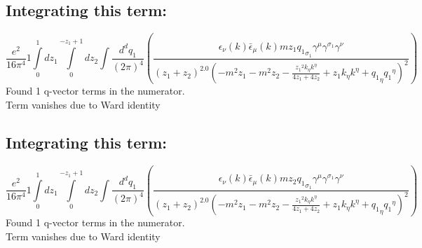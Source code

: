 \subsection*{Integrating this term:}
\begin{dmath}\frac{e^{2}}{16 \pi^{4}}1\int\limits_{ 0 }^{ 1 } d{ z_{ 1 } }\int\limits_{ 0 }^{ - { z_{ 1 } } + 1 } d{ z_{ 2 } }\int\frac{d^d q_1 }{ (2\pi)^4 }\left(\frac{\epsilon_{ \nu }({ k }) \bar{\epsilon}_{ \mu }({ k }) m { z_{ 1 } } { { q_1 }_{ \sigma_1 } } { \gamma^{ \mu } } { \gamma^{ \sigma_1 } } { \gamma^{ \nu } }}{\left({ z_{ 1 } } + { z_{ 2 } }\right)^{2.0} \left(- m^{2} { z_{ 1 } } - m^{2} { z_{ 2 } } - \frac{{ z_{ 1 } }^{2} { { k }_{ \eta } } { { k }^{ \eta } }}{4 { z_{ 1 } } + 4 { z_{ 2 } }} + { z_{ 1 } } { { k }_{ \eta } } { { k }^{ \eta } } + { { q_1 }_{ \eta } } { { q_1 }^{ \eta } }\right)^{2}}\right)\end{dmath}
Found 1 q-vector terms in the numerator.\\
Term vanishes due to Ward identity\\
\subsection*{Integrating this term:}
\begin{dmath}\frac{e^{2}}{16 \pi^{4}}1\int\limits_{ 0 }^{ 1 } d{ z_{ 1 } }\int\limits_{ 0 }^{ - { z_{ 1 } } + 1 } d{ z_{ 2 } }\int\frac{d^d q_1 }{ (2\pi)^4 }\left(\frac{\epsilon_{ \nu }({ k }) \bar{\epsilon}_{ \mu }({ k }) m { z_{ 2 } } { { q_1 }_{ \sigma_1 } } { \gamma^{ \mu } } { \gamma^{ \sigma_1 } } { \gamma^{ \nu } }}{\left({ z_{ 1 } } + { z_{ 2 } }\right)^{2.0} \left(- m^{2} { z_{ 1 } } - m^{2} { z_{ 2 } } - \frac{{ z_{ 1 } }^{2} { { k }_{ \eta } } { { k }^{ \eta } }}{4 { z_{ 1 } } + 4 { z_{ 2 } }} + { z_{ 1 } } { { k }_{ \eta } } { { k }^{ \eta } } + { { q_1 }_{ \eta } } { { q_1 }^{ \eta } }\right)^{2}}\right)\end{dmath}
Found 1 q-vector terms in the numerator.\\
Term vanishes due to Ward identity\\
